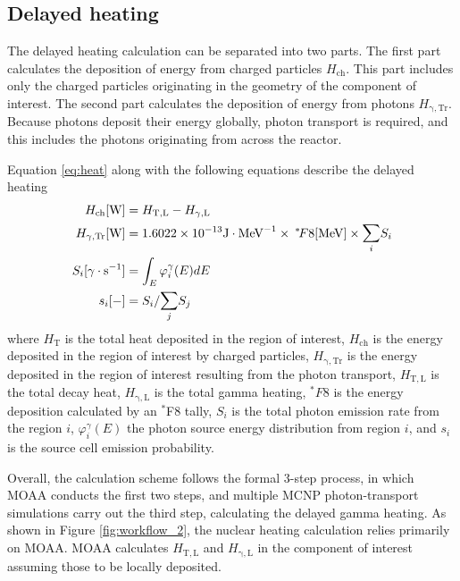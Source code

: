 \documentclass{style/nseJournal}
\begin{document}
\subsection{Delayed heating}

The delayed heating calculation can be separated into two parts.
The first part calculates the deposition of energy from charged particles $H_{\mathrm{ch}}$.
This part includes only the charged particles originating in the geometry of the component of interest.
The second part calculates the deposition of energy from photons $H_{\mathrm{\gamma, Tr}}$.
Because photons deposit their energy globally, photon transport is required, and this includes the photons originating from across the reactor.

Equation \ref{eq:heat} along with the following equations describe the delayed heating
\begin{align}
H_{\mathrm{ch}} [\mathrm{W}] &= H_{\mathrm{T,L}} - H_{\mathrm{\gamma, L}} \\
H_{\mathrm{\gamma, Tr}} [\mathrm{W}] &= 1.6022 \times 10^{-13} \mathrm{J} \cdot \mathrm{MeV}^{-1} \times \: ^* \! F8 [\mathrm{MeV}] \times \mathlarger{\sum}_i S_i \label{eq-ga-tr} \\
S_i[\mathrm{\gamma} \cdot \mathrm{s}^{-1}] &= \int_{E} \varphi^\gamma_i(E) dE \\
s_i [-] &= S_i / \mathlarger{\sum}_j S_j \label{eq-emiprob}
\end{align}
where $H_{\mathrm{T}}$ is the total heat deposited in the region of interest, $H_{\mathrm{ch}}$ is the energy deposited in the region of interest by charged particles, $H_{\mathrm{\gamma, Tr}}$ is the energy deposited in the region of interest resulting from the photon transport, $H_{\mathrm{T,L}}$ is the total decay heat, $H_{\mathrm{\gamma, L}}$ is the total gamma heating, $^\ast F8$ is the energy deposition calculated by an $^\ast$F8 tally, $S_i$ is the total photon emission rate from the region $i$, $\varphi^\gamma_i(E)$ the photon source energy distribution from region $i$, and $s_i$ is the source cell emission probability.

Overall, the calculation scheme follows the formal 3-step process, in which MOAA conducts the first two steps, and multiple MCNP photon-transport simulations carry out the third step, calculating the delayed gamma heating.
As shown in Figure \ref{fig:workflow_2}, the nuclear heating calculation relies primarily on MOAA.
MOAA calculates $H_{\mathrm{T,L}}$ and $H_{\mathrm{\gamma, L}}$ in the component of interest assuming those to be locally deposited.
\end{document}
